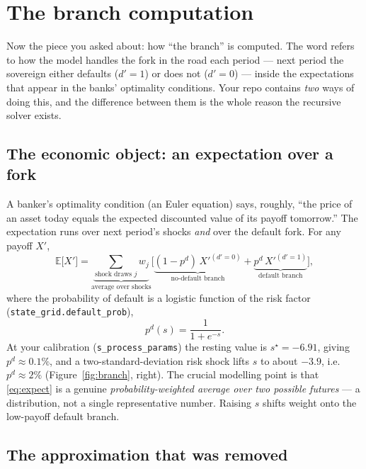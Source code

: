 \documentclass[11pt]{article}
\newcommand{\E}{\mathbb{E}}
\newcommand{\code}[1]{\texttt{#1}}
\begin{document}
\section{The branch computation}
\label{sec:branch}

Now the piece you asked about: how ``the branch'' is computed. The word
refers to how the model handles the fork in the road each period --- next
period the sovereign either defaults ($d'=1$) or does not ($d'=0$) --- inside
the expectations that appear in the banks' optimality conditions. Your repo
contains \emph{two} ways of doing this, and the difference between them is
the whole reason the recursive solver exists.

\subsection{The economic object: an expectation over a fork}

A banker's optimality condition (an Euler equation) says, roughly, ``the
price of an asset today equals the expected discounted value of its payoff
tomorrow.'' The expectation runs over next period's shocks \emph{and} over
the default fork. For any payoff $X'$,
\begin{equation}
\E\big[X'\big]
=\underbrace{\sum_{\text{shock draws }j} w_j}_{\text{average over shocks}}
\Big[\underbrace{(1-p^d)\,X'^{(d'=0)}}_{\text{no-default branch}}
+\underbrace{p^d\,X'^{(d'=1)}}_{\text{default branch}}\Big],
\label{eq:expect}
\end{equation}
where the probability of default is a logistic function of the risk factor
(\code{state\_grid.default\_prob}),
\begin{equation}
p^d(s)=\frac{1}{1+e^{-s}}.
\label{eq:pd}
\end{equation}
At your calibration (\code{s\_process\_params}) the resting value is
$s^\star=-6.91$, giving $p^d\approx0.1\%$, and a two-standard-deviation risk
shock lifts $s$ to about $-3.9$, i.e. $p^d\approx2\%$ (Figure~\ref{fig:branch},
right). The crucial modelling point is that \eqref{eq:expect} is a genuine
\emph{probability-weighted average over two possible futures} --- a
distribution, not a single representative number. Raising $s$ shifts weight
onto the low-payoff default branch.

\subsection{The approximation that was removed}
\end{document}
